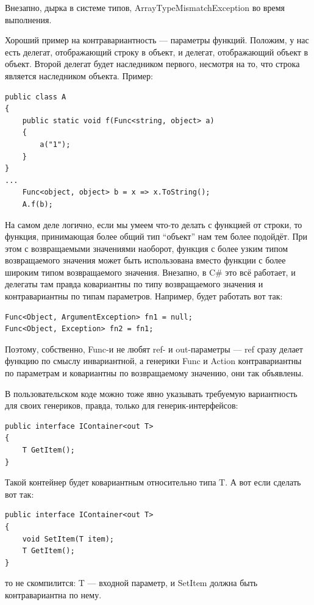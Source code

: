 \documentclass[a5paper]{article}
\begin{document}
Внезапно, дырка в системе типов, ArrayTypeMismatchException во время выполнения.

Хороший пример на контравариантность --- параметры функций. Положим, у нас есть делегат, отображающий строку в объект, и делегат, отображающий объект в объект. Второй делегат будет наследником первого, несмотря на то, что строка является наследником объекта. Пример:

\begin{verbatim}
public class A
{
    public static void f(Func<string, object> a)
    {
        a("1");
    }
}
...
    Func<object, object> b = x => x.ToString();
    A.f(b);
\end{verbatim}

На самом деле логично, если мы умеем что-то делать с функцией от строки, то функция, принимающая более общий тип ``объект'' нам тем более подойдёт. При этом с возвращаемыми значениями наоборот, функция с более узким типом возвращаемого значения может быть использована вместо функции с более широким типом возвращаемого значения. Внезапно, в C\# это всё работает, и делегаты там правда ковариантны по типу возвращаемого значения и контравариантны по типам параметров. Например, будет работать вот так:

\begin{verbatim}
Func<Object, ArgumentException> fn1 = null;
Func<Object, Exception> fn2 = fn1;
\end{verbatim}

Поэтому, собственно, Func-и не любят ref- и out-параметры --- ref сразу делает функцию по смыслу инвариантной, а генерики Func и Action контравариантны по параметрам и ковариантны по возвращаемому значению, они так объявлены.

В пользовательском коде можно тоже явно указывать требуемую вариантность для своих генериков, правда, только для генерик-интерфейсов:

\begin{verbatim}
public interface IContainer<out T>
{
    T GetItem();
}
\end{verbatim}

Такой контейнер будет ковариантным относительно типа T. А вот если сделать вот так:

\begin{verbatim}
public interface IContainer<out T>
{
    void SetItem(T item);
    T GetItem();
}
\end{verbatim}

то не скомпилится: T --- входной параметр, и SetItem должна быть контравариантна по нему.
\end{document}
